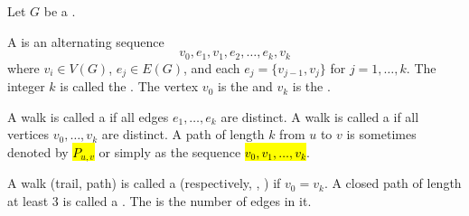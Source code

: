 \begin{definition} \label{definition:walk_path_trail_cycle_in_a_graph}
Let $G$ be a .

A  is an alternating sequence
$$v_0, e_1, v_1, e_2, \dots, e_k, v_k$$
where $v_i \in V(G)$, $e_j \in E(G)$, and each $e_j = \{v_{j-1}, v_j\}$ for $j = 1, \dots, k$. The integer $k$ is called the . The vertex $v_0$ is the  and $v_k$ is the .

A walk is called a  if all edges $e_1, \dots, e_k$ are distinct. A walk is called a  if all vertices $v_0, \dots, v_k$ are distinct. A path of length $k$ from $u$ to $v$ is sometimes denoted by \hl{$P_{u,v}$} or simply as the sequence \hl{$v_0, v_1, \dots, v_k$}.

A walk (trail, path) is called a  (respectively, , ) if $v_0 = v_k$. A closed path of length at least 3 is called a . The  is the number of edges in it.
\end{definition}

